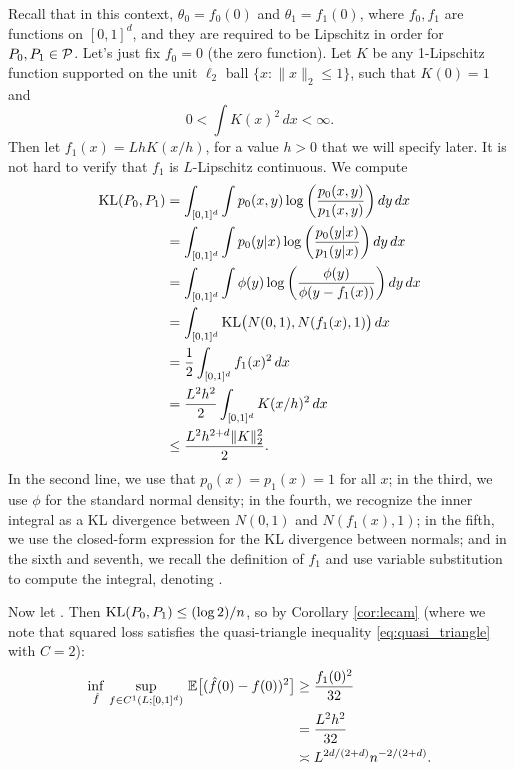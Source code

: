 \documentclass{article}
\begin{document}
Recall that in this context, $\theta_0 = f_0(0)$ and $\theta_1 = f_1(0)$, where
$f_0,f_1$ are functions on $[0,1]^d$, and they are required to be Lipschitz in
order for $P_0,P_1 \in \mathcal{P}$. Let's just fix $f_0 = 0$ (the zero function). Let 
$K$ be any 1-Lipschitz function supported on the unit $\ell_2$ ball $\{ x :
\|x\|_2 \leq 1 \}$, such that $K(0) = 1$ and     
\[
0 < \int K(x)^2 \, dx < \infty.
\]
Then let $f_1(x) = Lh K(x/h)$, for a value $h > 0$ that we will specify
later. It is not hard to verify that $f_1$ is $L$-Lipschitz continuous.   
We compute
\begin{align*}
\mathrm{KL}(P_0,P_1) 
&= \int_{[0,1]^d} \int p_0(x,y) \log \bigg( \frac{p_0(x,y)}{p_1(x,y)} \bigg) \,
  dy \, dx \\  
&= \int_{[0,1]^d} \int p_0(y|x) \log \bigg( \frac{p_0(y|x)}{p_1(y|x)} \bigg) \,
  dy \, dx \\ 
&= \int_{[0,1]^d} \int \phi(y) \log \bigg( \frac{\phi(y)}{\phi(y - f_1(x))}
  \bigg) \, dy \, dx \\
&= \int_{[0,1]^d} \mathrm{KL}\big( N(0,1), N(f_1(x), 1) \big) \, dx \\
&= \frac{1}{2} \int_{[0,1]^d} f_1(x)^2 \, dx \\
&= \frac{L^2 h^2}{2} \int_{[0,1]^d} K(x/h)^2 \, dx \\
&\leq \frac{L^2 h^{2+d} \|K\|_2^2}{2}.
\end{align*}
In the second line, we use that $p_0(x) = p_1(x) = 1$ for all $x$; in the third,
we use $\phi$ for the standard normal density; in the fourth, we recognize the
inner integral as a KL divergence between $N(0,1)$ and $N(f_1(x),1)$; in the
fifth, we use the closed-form expression for the KL divergence between normals; 
and in the sixth and seventh, we recall the definition of $f_1$ and use variable 
substitution to compute the integral, denoting .   

Now let . Then
$\mathrm{KL}(P_0,P_1) \leq (\log 2)/n$, so by Corollary \ref{cor:lecam} (where we note
that squared loss satisfies the quasi-triangle inequality
\eqref{eq:quasi_triangle} with $C=2$):     
\begin{align*}
\inf_{\hat{f}} \, \sup_{f \in C^1(L; [0,1]^d)} \, \mathbb{E}\big[ (\hat{f}(0) - f(0))^2 \big] 
&\geq \frac{f_1(0)^2}{32} \\ 
&= \frac{L^2 h^2}{32} \\
&\asymp L^{2d/(2+d)} n^{-2/(2+d)}. 
\end{align*}
\end{document}
